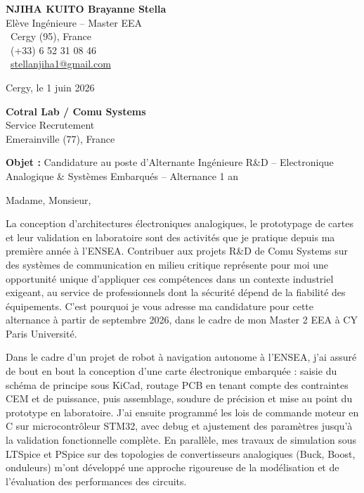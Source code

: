 \documentclass[a4paper,11pt]{article}
\begin{document}
\noindent
\begin{minipage}[t]{0.5\textwidth}
    \textbf{NJIHA KUITO Brayanne Stella}\\
    Elève Ingénieure -- Master EEA\\[3pt]
    \faMapMarker\ Cergy (95), France\\
    \faPhone\ (+33) 6 52 31 08 46\\
    \faEnvelope\ \href{mailto:stellanjiha1@gmail.com}{stellanjiha1@gmail.com}
\end{minipage}
\hfill
\begin{minipage}[t]{0.4\textwidth}
    \raggedleft
    Cergy, le 1 juin 2026
\end{minipage}

\vspace{1.2cm}

\hfill
\begin{minipage}[t]{0.5\textwidth}
    \raggedleft
    \textbf{Cotral Lab / Comu Systems}\\
    Service Recrutement\\
    Emerainville (77), France
\end{minipage}

\vspace{1cm}

\noindent\textbf{Objet :} Candidature au poste d'Alternante Ingénieure R\&D -- Electronique Analogique \& Systèmes Embarqués -- Alternance 1 an

\vspace{0.8cm}

Madame, Monsieur,

La conception d'architectures électroniques analogiques, le prototypage de cartes et leur validation en laboratoire sont des activités que je pratique depuis ma première année à l'ENSEA. Contribuer aux projets R\&D de Comu Systems sur des systèmes de communication en milieu critique représente pour moi une opportunité unique d'appliquer ces compétences dans un contexte industriel exigeant, au service de professionnels dont la sécurité dépend de la fiabilité des équipements. C'est pourquoi je vous adresse ma candidature pour cette alternance à partir de septembre 2026, dans le cadre de mon Master 2 EEA à CY Paris Université.

Dans le cadre d'un projet de robot à navigation autonome à l'ENSEA, j'ai assuré de bout en bout la conception d'une carte électronique embarquée : saisie du schéma de principe sous KiCad, routage PCB en tenant compte des contraintes CEM et de puissance, puis assemblage, soudure de précision et mise au point du prototype en laboratoire. J'ai ensuite programmé les lois de commande moteur en C sur microcontrôleur STM32, avec debug et ajustement des paramètres jusqu'à la validation fonctionnelle complète. En parallèle, mes travaux de simulation sous LTSpice et PSpice sur des topologies de convertisseurs analogiques (Buck, Boost, onduleurs) m'ont développé une approche rigoureuse de la modélisation et de l'évaluation des performances des circuits.
\end{document}
